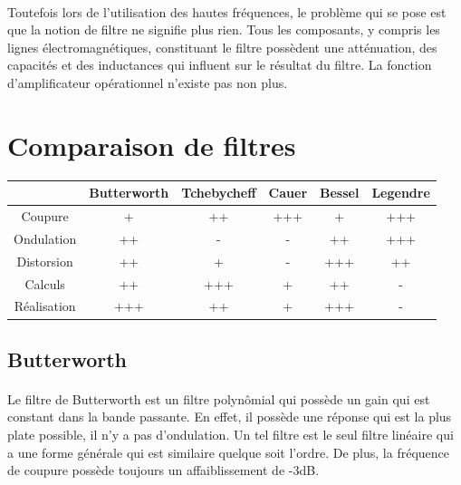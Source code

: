 \documentclass[a4paper,11pt]{article}
\begin{document}
    \paragraph{}
Toutefois lors de l’utilisation des hautes fréquences, le problème qui se pose est que la notion de filtre ne signifie plus rien.
Tous les composants, y compris les lignes électromagnétiques, constituant le filtre possèdent une atténuation,
des capacités et des inductances qui influent sur le résultat du filtre.
La fonction d’amplificateur opérationnel n’existe pas non plus.



\section{Comparaison de filtres}

    \begin{tabular}{|c|c|c|c|c|c|}
        \hline
                        & Butterworth   & Tchebycheff   & Cauer     & Bessel    & Legendre  \\
        \hline
            Coupure     & +             & ++            & +++       & +         & +++       \\
        \hline
            Ondulation  & ++            & -             & -         & ++        & +++       \\
        \hline
            Distorsion  & ++            & +             & -         & +++       & ++        \\
        \hline
            Calculs     & ++            & +++           & +         & ++        & -         \\
        \hline
            Réalisation & +++           & ++            & +         & +++       & -         \\
        \hline
    \end{tabular}

    \subsection{Butterworth}
        \paragraph{}
Le filtre de Butterworth est un filtre polynômial qui possède un gain qui est constant dans la bande passante.
En effet, il possède une réponse qui est la plus plate possible, il n’y a pas d’ondulation.
Un tel filtre est le seul filtre linéaire qui a une forme générale qui est similaire quelque soit l’ordre.
De plus, la fréquence de coupure possède toujours un affaiblissement de -3dB.
\end{document}
